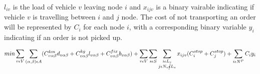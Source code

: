 \documentclass[a4paper,10pt]{article}
\begin{document}
$l_{iv}$ is the load of vehicle $v$ leaving node $i$ and $x_{ijv}$ is a binary vairable indicating if vehicle $v$ is travelling between $i$ and $j$ node. 
The cost of not transporting an order will be represented by $C_i$ for each node $i$, with a corresponding binary variable $y_i$ indicating if an order is not picked up.

\begin{equation}
\label{eq:1}
	min\sum_{v\epsilon V} \sum_{(\alpha, \beta) \epsilon A} ( C^{km}_{v\alpha\beta}d_{v\alpha\beta} + C^{kg}_{v\alpha\beta}l_{v\alpha\beta} + C^{fix}_{v\alpha\beta}b_{v\alpha\beta} ) + \sum_{v\epsilon V}\sum_{s\epsilon S}\sum_{\substack{i \epsilon L_s\\j \epsilon N_v\cancel{\epsilon} L_s}}x_{ijv}(C^{stop}_i + C^{stop}_j) + \sum_{i\epsilon N^P}C_iy_i
\end{equation}
\end{document}
